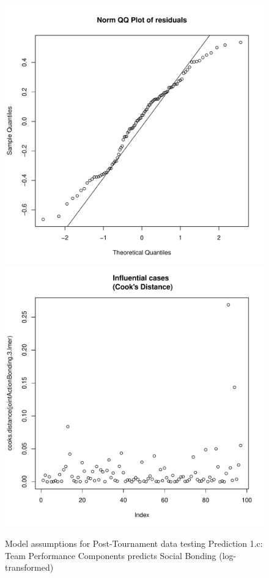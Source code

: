 \begin{CJK}{UTF8}{gbsn}
\begin{figure}[htbp]
              \includegraphics[scale =.4]{images/MLM3aLogQQNorm.pdf}
              \includegraphics[scale =.4]{images/MLM3aLogCooksD.pdf}
              \caption{Model assumptions for Post-Tournament data testing Prediction 1.c: Team Performance Components predicts Social Bonding (log-transformed)}
              \label{fig:MLM3aLogAssumptions}
            \end{figure}








\end{CJK}
